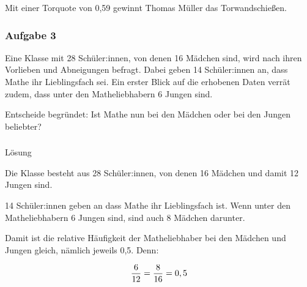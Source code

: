 \documentclass[
  ngerman,
]{book}
\begin{document}
Mit einer Torquote von 0,59 gewinnt Thomas Müller das Torwandschießen.

\hypertarget{section-11}{%
\subsubsection*{}\label{section-11}}

\hypertarget{aufgabe-3}{%
\subsubsection*{Aufgabe 3}\label{aufgabe-3}}

Eine Klasse mit 28 Schüler:innen, von denen 16 Mädchen sind, wird nach ihren Vorlieben und Abneigungen befragt. Dabei geben 14 Schüler:innen an, dass Mathe ihr Lieblingsfach sei. Ein erster Blick auf die erhobenen Daten verrät zudem, dass unter den Matheliebhabern 6 Jungen sind.

Entscheide begründet: Ist Mathe nun bei den Mädchen oder bei den Jungen beliebter?

\hypertarget{section-12}{%
\subsubsection*{}\label{section-12}}

Lösung

Die Klasse besteht aus 28 Schüler:innen, von denen 16 Mädchen und damit 12 Jungen sind.

14 Schüler:innen geben an dass Mathe ihr Lieblingsfach ist. Wenn unter den Matheliebhabern 6 Jungen sind, sind auch 8 Mädchen darunter.

Damit ist die relative Häufigkeit der Matheliebhaber bei den Mädchen und Jungen gleich, nämlich jeweils 0,5. Denn:

\[{6 \over 12} ={8 \over 16} = 0,5\]

\hypertarget{section-13}{%
\subsubsection*{}\label{section-13}}

\hypertarget{section-14}{%
\subsubsection*{}\label{section-14}}
\end{document}
